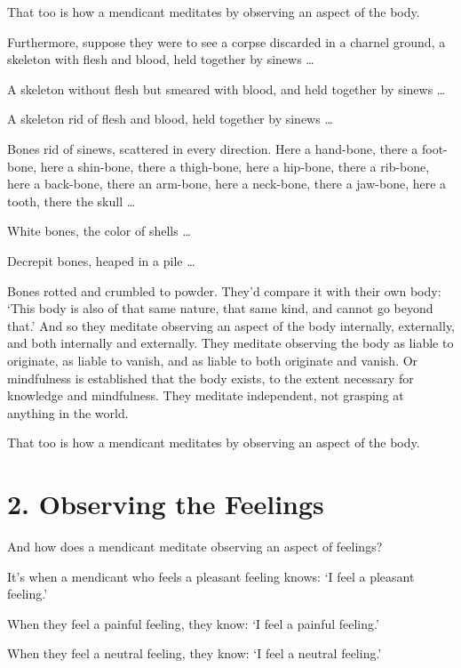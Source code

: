 \documentclass[12pt,openany]{book}%
\begin{document}
That too is how a mendicant meditates by observing an aspect of the body. 

Furthermore, suppose they were to see a corpse discarded in a charnel ground, a skeleton with flesh and blood, held together by sinews … 

A skeleton without flesh but smeared with blood, and held together by sinews … 

A skeleton rid of flesh and blood, held together by sinews … 

Bones rid of sinews, scattered in every direction. Here a hand-bone, there a foot-bone, here a shin-bone, there a thigh-bone, here a hip-bone, there a rib-bone, here a back-bone, there an arm-bone, here a neck-bone, there a jaw-bone, here a tooth, there the skull … 

White bones, the color of shells … 

Decrepit bones, heaped in a pile … 

Bones rotted and crumbled to powder. They’d compare it with their own body: ‘This body is also of that same nature, that same kind, and cannot go beyond that.’ And so they meditate observing an aspect of the body internally, externally, and both internally and externally. They meditate observing the body as liable to originate, as liable to vanish, and as liable to both originate and vanish. Or mindfulness is established that the body exists, to the extent necessary for knowledge and mindfulness. They meditate independent, not grasping at anything in the world. 

That too is how a mendicant meditates by observing an aspect of the body. 

\section*{2. Observing the Feelings }

And how does a mendicant meditate observing an aspect of feelings? 

It’s when a mendicant who feels a pleasant feeling knows: ‘I feel a pleasant feeling.’ 

When they feel a painful feeling, they know: ‘I feel a painful feeling.’ 

When they feel a neutral feeling, they know: ‘I feel a neutral feeling.’ 
\end{document}
